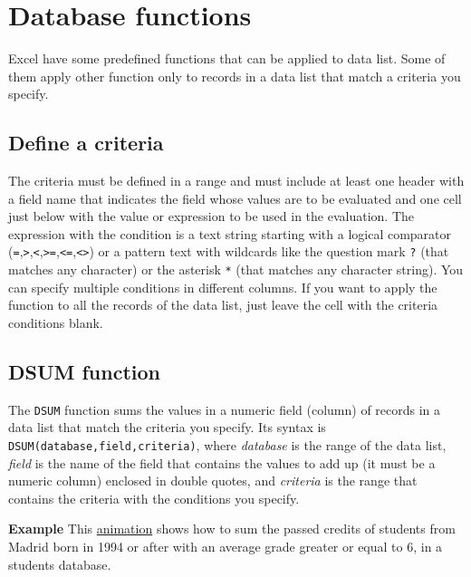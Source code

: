 \section{Database functions}\hypertarget{database-functions}{}\label{database-functions}

Excel have some predefined functions that can be applied to data list. Some of them apply other function only to records in a data list that match a criteria you specify.

\subsection{Define a criteria}\hypertarget{define-a-criteria}{}\label{define-a-criteria}

The criteria must be defined in a range and must include at least one header with a field name that indicates the field whose values are to be evaluated and one cell just below with the value or expression to be used in the evaluation. The expression with the condition is a text string starting with a logical comparator (\texttt{=},\texttt{\textgreater{}},\texttt{\textless{}},\texttt{\textgreater{}=},\texttt{\textless{}=},\texttt{\textless{}\textgreater{}}) or a pattern text with wildcards like the question mark \texttt{?} (that matches any character) or the asterisk \texttt{*} (that matches any character string). You can specify multiple conditions in different columns. If you want to apply the function to all the records of the data list, just leave the cell with the criteria conditions blank.

\subsection{DSUM function}\hypertarget{dsum-function}{}\label{dsum-function}

The \texttt{DSUM} function sums the values in a numeric field (column) of records in a data list that match the criteria you specify. Its syntax is \texttt{DSUM(database,field,criteria)}, where \emph{database} is the range of the data list, \emph{field} is the name of the field that contains the values to add up (it must be a numeric column) enclosed in double quotes, and \emph{criteria} is the range that contains the criteria with the conditions you specify.

\textbf{Example} This \href{http://aprendeconalf.es/office/excel/manual/img/example_function_dsum.gif}{animation} shows how to sum the passed credits of students from Madrid born in 1994 or after with an average grade greater or equal to 6, in a students database.

